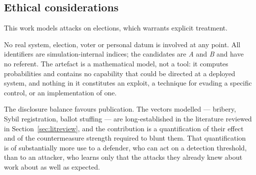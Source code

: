 \subsection{Ethical considerations}

This work models attacks on elections, which warrants explicit
treatment.

No real system, election, voter or personal datum is involved at any
point. All identifiers are simulation-internal indices; the candidates
are \emph{A} and \emph{B} and have no referent. The artefact is a
mathematical model, not a tool: it computes probabilities and contains
no capability that could be directed at a deployed system, and nothing
in it constitutes an exploit, a technique for evading a specific
control, or an implementation of one.

The disclosure balance favours publication. The vectors modelled ---
bribery, Sybil registration, ballot stuffing --- are long-established
in the literature reviewed in Section~\ref{sec:litreview}, and the
contribution is a quantification of their effect and of the
countermeasure strength required to blunt them. That quantification is
of substantially more use to a defender, who can act on a detection
threshold, than to an attacker, who learns only that the attacks they
already knew about work about as well as expected.
